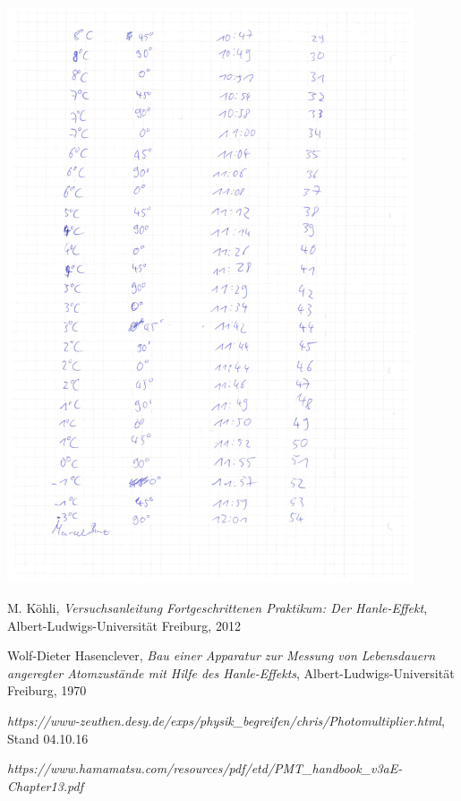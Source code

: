 \documentclass[12pt]{article}
\begin{document}
\begin{minipage}{\textwidth}
	\centering
	\includegraphics[width=0.9\textwidth]{laborbuch/laborbuch6.pdf}
\end{minipage}
\newpage
\listoffigures


\newpage
\thispagestyle{empty}
\begin{thebibliography}{9}

  

  
  

M. Köhli,
\emph{Versuchsanleitung Fortgeschrittenen Praktikum: Der Hanle-Effekt},
Albert-Ludwigs-Universität Freiburg,
2012

Wolf-Dieter Hasenclever,
\emph{Bau einer Apparatur zur Messung von Lebensdauern angeregter Atomzustände mit Hilfe des Hanle-Effekts},
Albert-Ludwigs-Universität Freiburg,
1970

\emph{https://www-zeuthen.desy.de/exps/physik\_begreifen/chris/Photomultiplier.html}, Stand 04.10.16

\emph{https://www.hamamatsu.com/resources/pdf/etd/PMT\_handbook\_v3aE-Chapter13.pdf}


\end{thebibliography}
\end{document}
